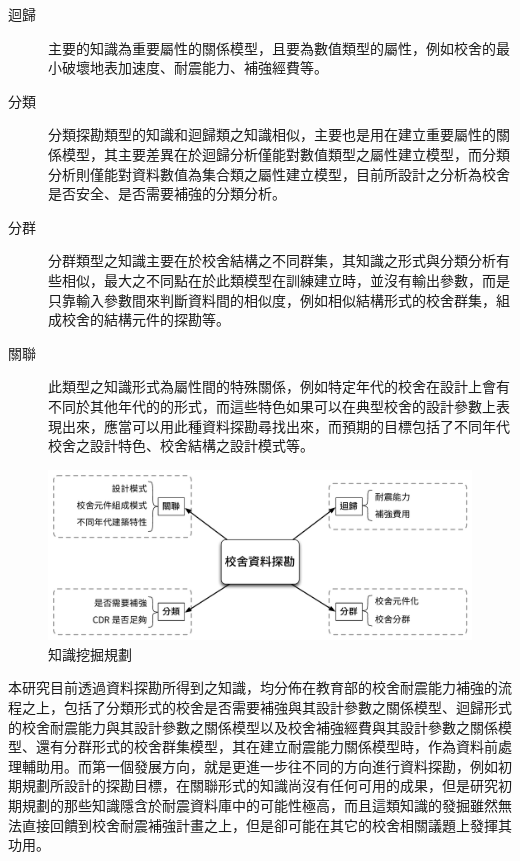 \begin{description}
  \item[迴歸]
  主要的知識為重要屬性的關係模型，且要為數值類型的屬性，例如校舍的最小破壞地表加速度、耐震能力、補強經費等。
  \item[分類]
  分類探勘類型的知識和迴歸類之知識相似，主要也是用在建立重要屬性的關係模型，其主要差異在於迴歸分析僅能對數值類型之屬性建立模型，而分類分析則僅能對資料數值為集合類之屬性建立模型，目前所設計之分析為校舍是否安全、是否需要補強的分類分析。
  \item[分群]
  分群類型之知識主要在於校舍結構之不同群集，其知識之形式與分類分析有些相似，最大之不同點在於此類模型在訓練建立時，並沒有輸出參數，而是只靠輸入參數間來判斷資料間的相似度，例如相似結構形式的校舍群集，組成校舍的結構元件的探勘等。
  \item[關聯]
  此類型之知識形式為屬性間的特殊關係，例如特定年代的校舍在設計上會有不同於其他年代的的形式，而這些特色如果可以在典型校舍的設計參數上表現出來，應當可以用此種資料探勘尋找出來，而預期的目標包括了不同年代校舍之設計特色、校舍結構之設計模式等。
\end{description}

\begin{figure}[hbtp]
  \begin{center}
    \includegraphics[width=1.0\textwidth]{figures/big-picture.pdf}
    \caption{知識挖掘規劃} 
    \label{fig:bigpicture}
  \end{center}
\end{figure}

本研究目前透過資料探勘所得到之知識，均分佈在教育部的校舍耐震能力補強的流程之上，包括了分類形式的校舍是否需要補強與其設計參數之關係模型、迴歸形式的校舍耐震能力與其設計參數之關係模型以及校舍補強經費與其設計參數之關係模型、還有分群形式的校舍群集模型，其在建立耐震能力關係模型時，作為資料前處理輔助用。而第一個發展方向，就是更進一步往不同的方向進行資料探勘，例如初期規劃所設計的探勘目標，在關聯形式的知識尚沒有任何可用的成果，但是研究初期規劃的那些知識隱含於耐震資料庫中的可能性極高，而且這類知識的發掘雖然無法直接回饋到校舍耐震補強計畫之上，但是卻可能在其它的校舍相關議題上發揮其功用。


